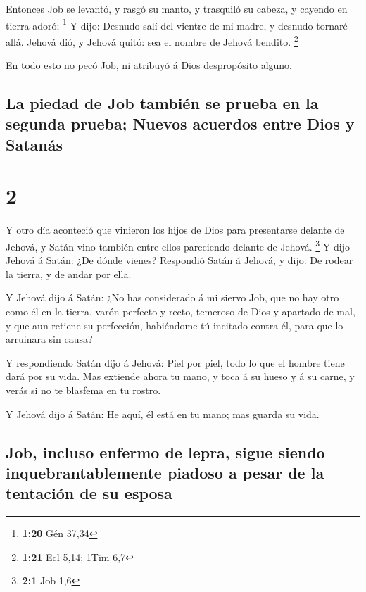  Entonces Job se levantó, y rasgó su manto, y trasquiló su
cabeza, y cayendo en tierra adoró; \footnote{\textbf{1:20} Gén 37,34}
 Y dijo: Desnudo salí del vientre de mi madre, y desnudo
tornaré allá. Jehová dió, y Jehová quitó: sea el nombre de Jehová
bendito. \footnote{\textbf{1:21} Ecl 5,14; 1Tim 6,7}

 En todo esto no pecó Job, ni atribuyó á Dios despropósito
alguno.

\hypertarget{la-piedad-de-job-tambiuxe9n-se-prueba-en-la-segunda-prueba-nuevos-acuerdos-entre-dios-y-satanuxe1s}{%
\subsection{La piedad de Job también se prueba en la segunda prueba;
Nuevos acuerdos entre Dios y
Satanás}\label{la-piedad-de-job-tambiuxe9n-se-prueba-en-la-segunda-prueba-nuevos-acuerdos-entre-dios-y-satanuxe1s}}

\hypertarget{section-1}{%
\section{2}\label{section-1}}

 Y otro día aconteció que vinieron los hijos de Dios para
presentarse delante de Jehová, y Satán vino también entre ellos
pareciendo delante de Jehová. \footnote{\textbf{2:1} Job 1,6}
 Y dijo Jehová á Satán: ¿De dónde vienes? Respondió Satán á
Jehová, y dijo: De rodear la tierra, y de andar por ella.

 Y Jehová dijo á Satán: ¿No has considerado á mi siervo Job,
que no hay otro como él en la tierra, varón perfecto y recto, temeroso
de Dios y apartado de mal, y que aun retiene su perfección, habiéndome
tú incitado contra él, para que lo arruinara sin causa?

 Y respondiendo Satán dijo á Jehová: Piel por piel, todo lo
que el hombre tiene dará por su vida.  Mas extiende ahora tu
mano, y toca á su hueso y á su carne, y verás si no te blasfema en tu
rostro.

 Y Jehová dijo á Satán: He aquí, él está en tu mano; mas
guarda su vida.

\hypertarget{job-incluso-enfermo-de-lepra-sigue-siendo-inquebrantablemente-piadoso-a-pesar-de-la-tentaciuxf3n-de-su-esposa}{%
\subsection{Job, incluso enfermo de lepra, sigue siendo
inquebrantablemente piadoso a pesar de la tentación de su
esposa}\label{job-incluso-enfermo-de-lepra-sigue-siendo-inquebrantablemente-piadoso-a-pesar-de-la-tentaciuxf3n-de-su-esposa}}

